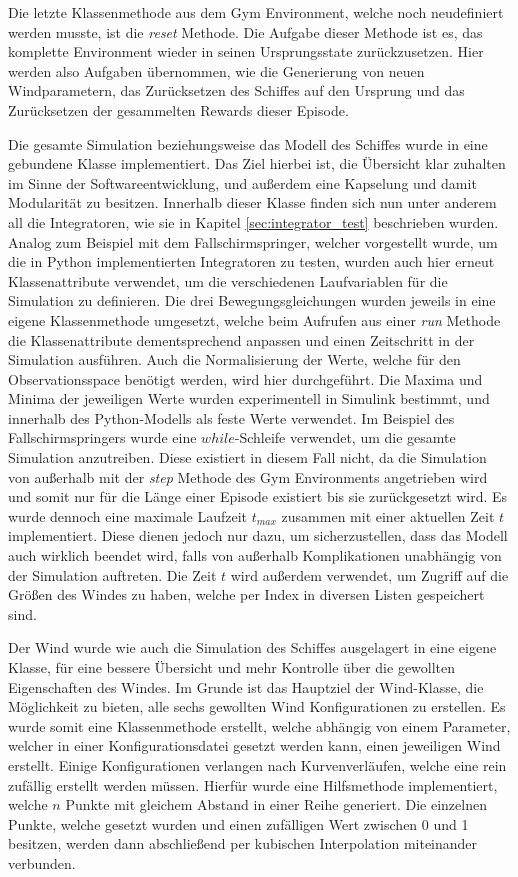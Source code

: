 \documentclass[]{iat}
\begin{document}
Die letzte Klassenmethode aus dem Gym Environment, welche noch neudefiniert werden musste, ist die \textit{reset} Methode. Die Aufgabe dieser Methode ist es, das komplette Environment wieder in seinen Ursprungsstate zurückzusetzen. Hier werden also Aufgaben übernommen, wie die Generierung von neuen Windparametern, das Zurücksetzen des Schiffes auf den Ursprung und das Zurücksetzen der gesammelten Rewards dieser Episode.

Die gesamte Simulation beziehungsweise das Modell des Schiffes wurde in eine gebundene Klasse implementiert. Das Ziel hierbei ist, die Übersicht klar zuhalten im Sinne der Softwareentwicklung, und außerdem eine Kapselung und damit Modularität zu besitzen. Innerhalb dieser Klasse finden sich nun unter anderem all die Integratoren, wie sie in Kapitel \ref{sec:integrator_test} beschrieben wurden. Analog zum Beispiel mit dem Fallschirmspringer, welcher vorgestellt wurde, um die in Python implementierten Integratoren zu testen, wurden auch hier erneut Klassenattribute verwendet, um die verschiedenen Laufvariablen für die Simulation zu definieren. Die drei Bewegungsgleichungen wurden jeweils in eine eigene Klassenmethode umgesetzt, welche beim Aufrufen aus einer \textit{run} Methode die Klassenattribute dementsprechend anpassen und einen Zeitschritt in der Simulation ausführen. Auch die Normalisierung der Werte, welche für den Observationsspace benötigt werden, wird hier durchgeführt. Die Maxima und Minima der jeweiligen Werte wurden experimentell in Simulink bestimmt, und innerhalb des Python-Modells als feste Werte verwendet. Im Beispiel des Fallschirmspringers wurde eine $while$-Schleife verwendet, um die gesamte Simulation anzutreiben. Diese existiert in diesem Fall nicht, da die Simulation von außerhalb mit der \textit{step} Methode des Gym Environments angetrieben wird und somit nur für die Länge einer Episode existiert bis sie zurückgesetzt wird. Es wurde dennoch eine maximale Laufzeit $t_{max}$ zusammen mit einer aktuellen Zeit $t$ implementiert. Diese dienen jedoch nur dazu, um sicherzustellen, dass das Modell auch wirklich beendet wird, falls von außerhalb Komplikationen unabhängig von der Simulation auftreten. Die Zeit $t$ wird außerdem verwendet, um Zugriff auf die Größen des Windes zu haben, welche per Index in diversen Listen gespeichert sind.

Der Wind wurde wie auch die Simulation des Schiffes ausgelagert in eine eigene Klasse, für eine bessere Übersicht und mehr Kontrolle über die gewollten Eigenschaften des Windes. Im Grunde ist das Hauptziel der Wind-Klasse, die Möglichkeit zu bieten, alle sechs gewollten Wind Konfigurationen zu erstellen. Es wurde somit eine Klassenmethode erstellt, welche abhängig von einem Parameter, welcher in einer Konfigurationsdatei gesetzt werden kann, einen jeweiligen Wind erstellt. Einige Konfigurationen verlangen nach Kurvenverläufen, welche eine rein zufällig erstellt werden müssen. Hierfür wurde eine Hilfsmethode implementiert, welche $n$ Punkte mit gleichem Abstand in einer Reihe generiert. Die einzelnen Punkte, welche gesetzt wurden und einen zufälligen Wert zwischen 0 und 1 besitzen, werden dann abschließend per kubischen Interpolation miteinander verbunden.
\end{document}
